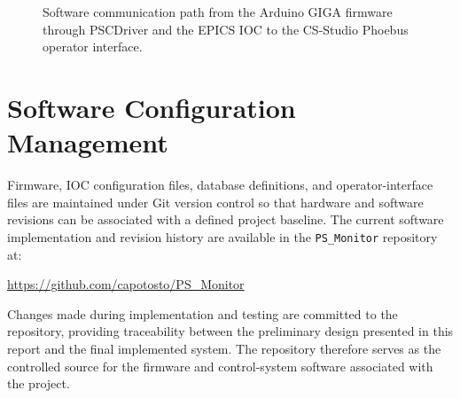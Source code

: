 \begin{figure}[H]
{%
    }

    \caption{
        Software communication path from the Arduino GIGA firmware through
        PSCDriver and the EPICS IOC to the CS-Studio Phoebus operator interface.
    }
    \label{fig:epics-data-flow}
\end{figure}


\section{Software Configuration Management}
\label{sec:software-configuration}

Firmware, IOC configuration files, database definitions, and operator-interface
files are maintained under Git version control so that hardware and software
revisions can be associated with a defined project baseline. The current
software implementation and revision history are available in the
\texttt{PS\_Monitor} repository at:

\begin{center}
    \url{https://github.com/capotosto/PS_Monitor}
\end{center}

Changes made during implementation and testing are committed to the repository,
providing traceability between the preliminary design presented in this report
and the final implemented system. The repository therefore serves as the
controlled source for the firmware and control-system software associated with
the project.

